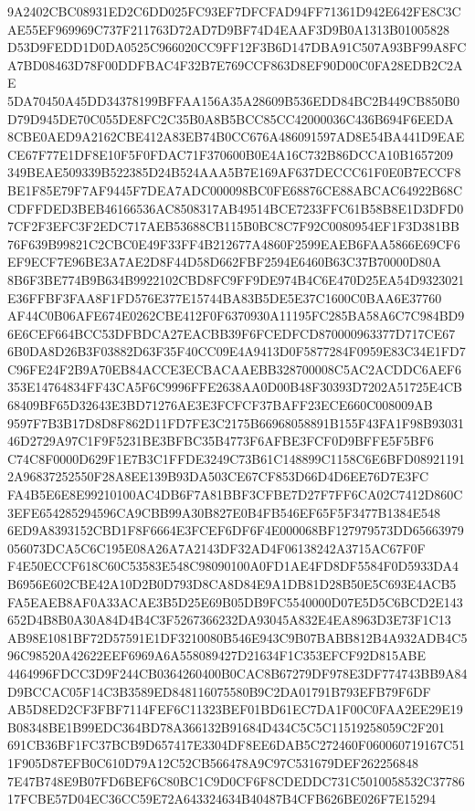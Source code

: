 \documentclass[UTF8,fontset=fandol,zihao=-4,a4paper]{ctexart}
\begin{document}
{{9A2402CBC08931ED2C6DD025FC93EF7DFCFAD94FF71361D942E642FE8C3CAE55EF969969C737F211763D72AD7D9BF74D4EAAF3D9B0A1313B01005828
D53D9FEDD1D0DA0525C966020CC9FF12F3B6D147DBA91C507A93BF99A8FCA7BD08463D78F00DDFBAC4F32B7E769CCF863D8EF90D00C0FA28EDB2C2AE
5DA70450A45DD34378199BFFAA156A35A28609B536EDD84BC2B449CB850B0D79D945DE70C055DE8FC2C35B0A8B5BCC85CC42000036C436B694F6EEDA
8CBE0AED9A2162CBE412A83EB74B0CC676A486091597AD8E54BA441D9EAECE67F77E1DF8E10F5F0FDAC71F370600B0E4A16C732B86DCCA10B1657209
349BEAE509339B522385D24B524AAA5B7E169AF637DECCC61F0E0B7ECCF8BE1F85E79F7AF9445F7DEA7ADC000098BC0FE68876CE88ABCAC64922B68C
CDFFDED3BEB46166536AC8508317AB49514BCE7233FFC61B58B8E1D3DFD07CF2F3EFC3F2EDC717AEB53688CB115B0BC8C7F92C0080954EF1F3D381BB
76F639B99821C2CBC0E49F33FF4B212677A4860F2599EAEB6FAA5866E69CF6EF9ECF7E96BE3A7AE2D8F44D58D662FBF2594E6460B63C37B70000D80A
8B6F3BE774B9B634B9922102CBD8FC9FF9DE974B4C6E470D25EA54D9323021E36FFBF3FAA8F1FD576E377E15744BA83B5DE5E37C1600C0BAA6E37760
AF44C0B06AFE674E0262CBE412F0F6370930A11195FC285BA58A6C7C984BD96E6CEF664BCC53DFBDCA27EACBB39F6FCEDFCD870000963377D717CE67
6B0DA8D26B3F03882D63F35F40CC09E4A9413D0F5877284F0959E83C34E1FD7C96FE24F2B9A70EB84ACCE3ECBACAAEBB328700008C5AC2ACDDC6AEF6
353E14764834FF43CA5F6C9996FFE2638AA0D00B48F30393D7202A51725E4CB68409BF65D32643E3BD71276AE3E3FCFCF37BAFF23ECE660C008009AB
9597F7B3B17D8D8F862D11FD7FE3C2175B66968058891B155F43FA1F98B9303146D2729A97C1F9F5231BE3BFBC35B4773F6AFBE3FCF0D9BFFE5F5BF6
C74C8F0000D629F1E7B3C1FFDE3249C73B61C148899C1158C6E6BFD089211912A96837252550F28A8EE139B93DA503CE67CF853D66D4D6EE76D7E3FC
FA4B5E6E8E99210100AC4DB6F7A81BBF3CFBE7D27F7FF6CA02C7412D860C3EFE654285294596CA9CBB99A30B827E0B4FB546EF65F5F3477B1384E548
6ED9A8393152CBD1F8F6664E3FCEF6DF6F4E000068BF127979573DD65663979056073DCA5C6C195E08A26A7A2143DF32AD4F06138242A3715AC67F0F
F4E50ECCF618C60C53583E548C98090100A0FD1AE4FD8DF5584F0D5933DA4B6956E602CBE42A10D2B0D793D8CA8D84E9A1DB81D28B50E5C693E4ACB5
FA5EAEB8AF0A33ACAE3B5D25E69B05DB9FC5540000D07E5D5C6BCD2E143652D4B8B0A30A84D4B4C3F5267366232DA93045A832E4EA8963D3E73F1C13
AB98E1081BF72D57591E1DF3210080B546E943C9B07BABB812B4A932ADB4C596C98520A42622EEF6969A6A558089427D21634F1C353EFCF92D815ABE
4464996FDCC3D9F244CB0364260400B0CAC8B67279DF978E3DF774743BB9A84D9BCCAC05F14C3B3589ED848116075580B9C2DA01791B793EFB79F6DF
AB5D8ED2CF3FBF7114FEF6C11323BEF01BD61EC7DA1F00C0FAA2EE29E19B08348BE1B99EDC364BD78A366132B91684D434C5C5C11519258059C2F201
691CB36BF1FC37BCB9D657417E3304DF8EE6DAB5C272460F060060719167C511F905D87EFB0C610D79A12C52CB566478A9C97C531679DEF262256848
7E47B748E9B07FD6BEF6C80BC1C9D0CF6F8CDEDDC731C5010058532C3778617FCBE57D04EC36CC59E72A643324634B40487B4CFB626BE026F7E15294
}}
\end{document}
